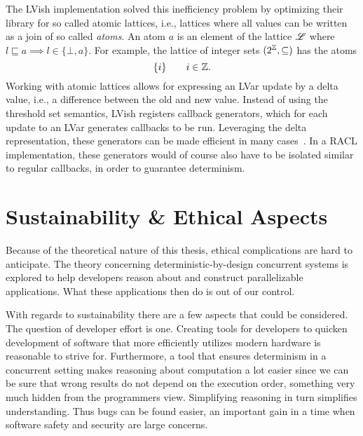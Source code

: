 The LVish implementation solved this inefficiency problem by optimizing their
library for so called atomic lattices, i.e., lattices where all values can be
written as a join of so called \emph{atoms}. An atom $a$ is an element of the
lattice $\mbox{$\mathscr{L}$}$ where $l \sqsubseteq a \implies l \in \{\bot, a\}$. For
example, the lattice of integer sets $(2^{\mathbb{Z}}, \subseteq)$ has the atoms
\begin{equation*}
  \{ i \} \quad\quad i \in \mathbb{Z}.
\end{equation*}
Working with atomic lattices allows for expressing an LVar update by a delta
value, i.e., a difference between the old and new value. Instead of using the
threshold set semantics, LVish registers callback generators, which for each
update to an LVar generates callbacks to be run. Leveraging the delta
representation, these generators can be made efficient in many
cases~\parencite{kuper2014freeze}. In a RACL implementation, these generators
would of course also have to be isolated similar to regular callbacks, in
order to guarantee determinism.

\section{Sustainability \& Ethical Aspects}%
\label{sec:sustainability_&_ethical_aspects}

Because of the theoretical nature of this thesis, ethical complications are hard
to anticipate. The theory concerning deterministic\hyp by-design concurrent
systems is explored to help developers reason about and construct parallelizable
applications. What these applications then do is out of our control.

With regards to sustainability there are a few aspects that could be
considered. The question of developer effort is one. Creating tools for
developers to quicken development of software that more efficiently utilizes
modern hardware is reasonable to strive for.  Furthermore, a tool that ensures
determinism in a concurrent setting makes reasoning about computation a lot
easier since we can be sure that wrong results do not depend on the execution
order, something very much hidden from the programmers view. Simplifying
reasoning in turn simplifies understanding. Thus bugs can be found easier, an
important gain in a time when software safety and security are large concerns.

